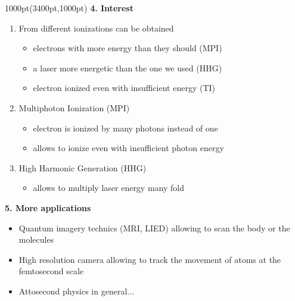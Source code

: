 \documentclass[12pt]{beamer}
\begin{document}
\begin{frame}
\begin{textblock*}{1000pt}(3400pt,1000pt)
{\huge\textbf {4. Interest}} \\\vspace{30pt}
%
%
\begin{enumerate}
\Large
\item From different ionizations can be obtained
\begin{itemize}
\large
\item[$\bullet$] electrons with more energy than they should (MPI)
\item[$\bullet$] a laser more energetic than the one we used (HHG)
\item[$\bullet$] electron ionized even with insufficient energy (TI)
\end{itemize}
\vspace{50pt}
\item Multiphoton Ionization (MPI)
\begin{itemize}
\large
\item[$\bullet$] electron is ionized by many photons instead of one
\item[$\bullet$] allows to ionize even with insufficient photon energy
\end{itemize}
\vspace{50pt}
\item High Harmonic Generation (HHG)
\begin{itemize}
\Large
\item[$\bullet$] allows to multiply laser energy many fold
\end{itemize}
\end{enumerate}
\vspace{100pt}
{\huge\textbf {5. More applications}} \\\vspace{30pt}
\begin{itemize}
\item Quantum imagery technics (MRI, LIED) allowing to scan 
the body or the molecules
\item High resolution camera allowing to track the movement of atoms 
at the femtosecond scale
\item Attosecond physics in general...
\end{itemize}



\end{textblock*}


\end{frame}
\end{document}
